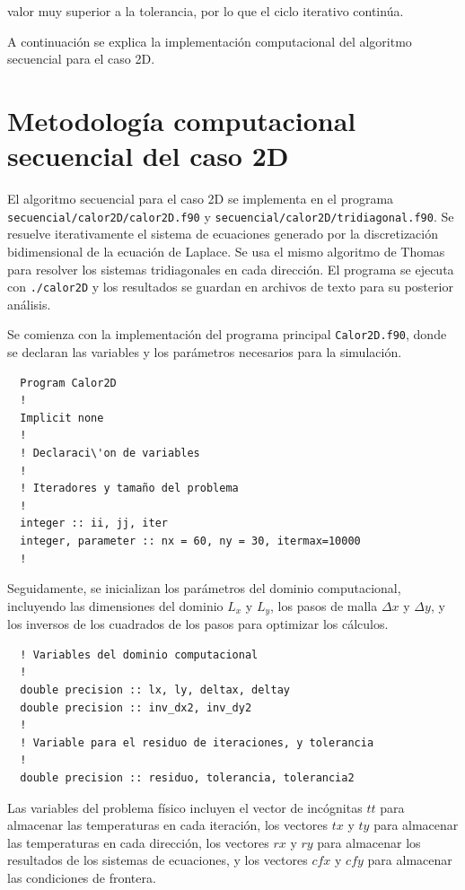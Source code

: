 \documentclass[11pt,a4paper]{article}
\begin{document}
valor muy superior a la tolerancia, por lo que el ciclo iterativo contin\'ua.

\medskip

A continuaci\'on se explica la implementaci\'on computacional del algoritmo 
secuencial para el caso 2D.

\section{Metodolog\'ia computacional secuencial del caso 2D}

El algoritmo secuencial para el caso 2D se implementa en el programa 
\texttt{secuencial/calor2D/calor2D.f90} y
\texttt{secuencial/calor2D/tridiagonal.f90}. Se resuelve iterativamente el 
sistema de ecuaciones generado por la discretización bidimensional de la 
ecuación de Laplace. Se usa el mismo algoritmo de Thomas para resolver los 
sistemas tridiagonales en cada dirección. El programa se ejecuta con 
\verb|./calor2D| y los resultados se guardan en archivos de texto para su 
posterior análisis.

\medskip

Se comienza con la implementación del programa principal \texttt{Calor2D.f90}, 
donde se declaran las variables y los parámetros necesarios para la simulación.

\begin{verbatim}
  Program Calor2D
  !
  Implicit none
  !
  ! Declaraci\'on de variables
  !
  ! Iteradores y tamaño del problema
  !
  integer :: ii, jj, iter
  integer, parameter :: nx = 60, ny = 30, itermax=10000
  !
\end{verbatim}

Seguidamente, se inicializan los parámetros del dominio computacional, 
incluyendo las dimensiones del dominio $L_x$ y $L_y$, los pasos de malla 
$\Delta x$ y $\Delta y$, y los inversos de los cuadrados de los pasos para 
optimizar los cálculos.

\begin{verbatim}
  ! Variables del dominio computacional
  !
  double precision :: lx, ly, deltax, deltay
  double precision :: inv_dx2, inv_dy2
  !
  ! Variable para el residuo de iteraciones, y tolerancia
  !
  double precision :: residuo, tolerancia, tolerancia2
\end{verbatim}

Las variables del problema físico incluyen el vector de incógnitas $tt$ para 
almacenar las temperaturas en cada iteración, los vectores $tx$ y $ty$ para 
almacenar las temperaturas en cada dirección, los vectores $rx$ y $ry$ para 
almacenar los resultados de los sistemas de ecuaciones, y los vectores $cfx$ y 
$cfy$ para almacenar las condiciones de frontera.
\end{document}
